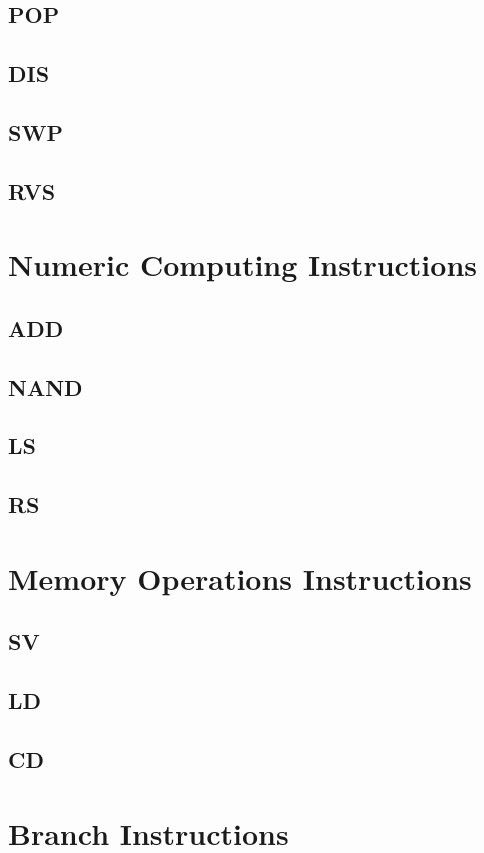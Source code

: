 \documentclass[11pt]{report}
\begin{document}
    \subsection{POP}
    \subsection{DIS}
    \subsection{SWP}
    \subsection{RVS}

    \section{Numeric Computing Instructions}
    \subsection{ADD}
    \subsection{NAND}
    \subsection{LS}
    \subsection{RS}

    \section{Memory Operations Instructions}
    \subsection{SV}
    \subsection{LD}
    \subsection{CD}

    \section{Branch Instructions}
\end{document}
